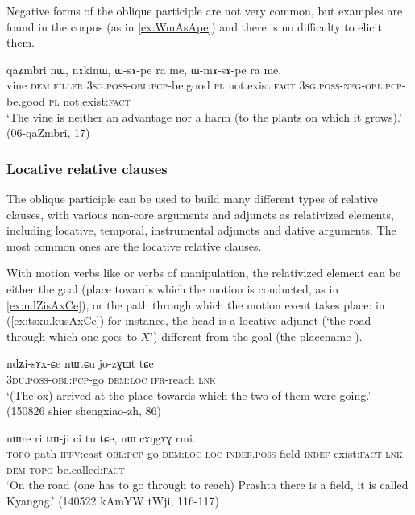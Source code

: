 Negative forms of the oblique participle are not very common, but examples are found in the corpus (as in \ref{ex:WmAsApe}) and there is no difficulty to elicit them.

\begin{exe}
\ex \label{ex:WmAsApe}
\gll  qaʑmbri nɯ, nɤkinɯ, ɯ-sɤ-pe ra me, ɯ-mɤ-sɤ-pe ra me, \\
vine \textsc{dem} \textsc{filler} \textsc{3sg}.\textsc{poss}-\textsc{obl}:\textsc{pcp}-be.good \textsc{pl} not.exist:\textsc{fact}  \textsc{3sg}.\textsc{poss}-\textsc{neg}-\textsc{obl}:\textsc{pcp}-be.good \textsc{pl} not.exist:\textsc{fact} \\
\glt `The vine is neither an advantage nor a harm (to the plants on which it grows).' (06-qaZmbri, 17)
\end{exe}


\subsubsection{Locative relative clauses} \label{sec:locative.participle.relatives}
The oblique participle can be used to build many different types of relative clauses, with various non-core arguments and adjuncts as relativized elements, including locative, temporal, instrumental adjuncts and dative arguments. The most common ones are the locative relative clauses.

With  motion verbs like  or verbs of manipulation, the relativized element can be either the goal (place towards which the motion is conducted, as in \ref{ex:ndZisAxCe}), or the path through which the motion event takes place: in (\ref{ex:tsxu.kusAxCe}) for instance, the head  is a locative adjunct (`the road through which one goes to $X$') different from the goal (the placename ).

\begin{exe}
\ex \label{ex:ndZisAxCe}
\gll ndʑi-sɤx-ɕe nɯtɕu jo-zɣɯt tɕe \\
\textsc{3du}.\textsc{poss}-\textsc{obl}:\textsc{pcp}-go \textsc{dem}:\textsc{loc} \textsc{ifr}-reach \textsc{lnk} \\
\glt  `(The ox) arrived at the place towards which the two of them were going.' (150826 shier shengxiao-zh, 86)
\end{exe}

\begin{exe}
\ex \label{ex:tsxu.kusAxCe}
 nɯre ri tɯ-ji ci tu tɕe, nɯ cɤŋgɤɣ rmi. \\
\textsc{topo} path \textsc{ipfv}:east-\textsc{obl}:\textsc{pcp}-go \textsc{dem}:\textsc{loc} \textsc{loc} \textsc{indef}.\textsc{poss}-field \textsc{indef} exist:\textsc{fact} \textsc{lnk} \textsc{dem}  \textsc{topo} be.called:\textsc{fact} \\
\glt  `On the road (one has to go through to reach) Prashta there is a field, it is called Kyangag.' (140522 kAmYW tWji, 116-117)
\end{exe}


